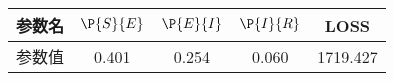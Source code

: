 \begin{tabular}{ccccc}
\hline
参数名&$\P{S}{E}$&$\P{E}{I}$&$\P{I}{R}$&LOSS\\
\hline
参数值&0.401&0.254&0.060&1719.427\\
\hline
\end{tabular}